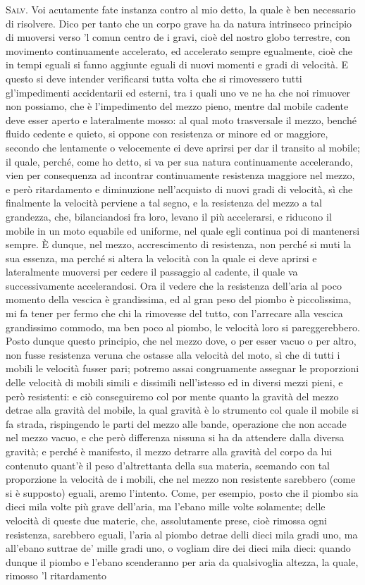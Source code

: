 \documentclass[11pt,twoside,openany]{book}
\newcommand{\speaker}[1]{\textcolor{rubric}{\textsc{#1}}\space}
\begin{document}
\speaker{Salv.} Voi acutamente fate instanza contro al mio detto, la quale è ben necessario di risolvere. Dico per tanto che un corpo grave ha da natura intrinseco principio di muoversi verso 'l comun centro de i gravi, cioè del nostro globo terrestre, con movimento continuamente accelerato, ed accelerato sempre egualmente, cioè che in tempi eguali si fanno aggiunte eguali di nuovi momenti e gradi di velocità. E questo si deve intender verificarsi tutta volta che si rimovessero tutti gl'impedimenti accidentarii ed esterni, tra i quali uno ve ne ha che noi rimuover non possiamo, che è l'impedimento del mezzo pieno, mentre dal mobile cadente deve esser aperto e lateralmente mosso: al qual moto trasversale il mezzo, benché fluido cedente e quieto, si oppone con resistenza or minore ed or maggiore, secondo che lentamente o velocemente ei deve aprirsi per dar il transito al mobile; il quale, perché, come ho detto, si va per sua natura continuamente accelerando, vien per consequenza ad incontrar continuamente resistenza maggiore nel mezzo, e però ritardamento e diminuzione nell'acquisto di nuovi gradi di velocità, sì che finalmente la velocità perviene a tal segno, e la resistenza del mezzo a tal grandezza, che, bilanciandosi fra loro, levano il più accelerarsi, e riducono il mobile in un moto equabile ed uniforme, nel quale egli continua poi di mantenersi sempre. È dunque, nel mezzo, accrescimento di resistenza, non perché si muti la sua essenza, ma perché si altera la velocità con la quale ei deve aprirsi e lateralmente muoversi per cedere il passaggio al cadente, il quale va successivamente accelerandosi. Ora il vedere che la resistenza dell'aria al poco momento della vescica è grandissima, ed al gran peso del piombo è piccolissima, mi fa tener per fermo che chi la rimovesse del tutto, con l'arrecare alla vescica grandissimo commodo, ma ben poco al piombo, le velocità loro si pareggerebbero. Posto dunque questo principio, che nel mezzo dove, o per esser vacuo o per altro, non fusse resistenza veruna che ostasse alla velocità del moto, sì che di tutti i mobili le velocità fusser pari; potremo assai congruamente assegnar le proporzioni delle velocità di mobili simili e dissimili nell'istesso ed in diversi mezzi pieni, e però resistenti: e ciò conseguiremo col por mente quanto la gravità del mezzo detrae alla gravità del mobile, la qual gravità è lo strumento col quale il mobile si fa strada, rispingendo le parti del mezzo alle bande, operazione che non accade nel mezzo vacuo, e che però differenza nissuna si ha da attendere dalla diversa gravità; e perché è manifesto, il mezzo detrarre alla gravità del corpo da lui contenuto quant'è il peso d'altrettanta della sua materia, scemando con tal proporzione la velocità de i mobili, che nel mezzo non resistente sarebbero (come si è supposto) eguali, aremo l'intento. Come, per esempio, posto che il piombo sia dieci mila volte più grave dell'aria, ma l'ebano mille volte solamente; delle velocità di queste due materie, che, assolutamente prese, cioè rimossa ogni resistenza, sarebbero eguali, l'aria al piombo detrae delli dieci mila gradi uno, ma all'ebano suttrae de' mille gradi uno, o vogliam dire dei dieci mila dieci: quando dunque il piombo e l'ebano scenderanno per aria da qualsivoglia altezza, la quale, rimosso 'l ritardamento 
\end{document}
